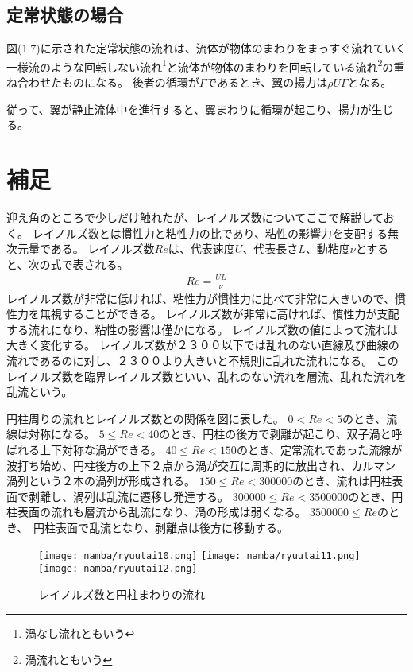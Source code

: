 \documentclass[10pt,b5paper,papersize,dvipdfmx]{jsbook}
\begin{document}
\subsection{定常状態の場合}
図(1.7)に示された定常状態の流れは、流体が物体のまわりをまっすぐ流れていく一様流のような回転しない流れ\footnote{渦なし流れともいう}と流体が物体のまわりを回転している流れ\footnote{渦流れともいう}の重ね合わせたものになる。
後者の循環が$\Gamma $であるとき、翼の揚力は$\rho U\Gamma$となる。
\par
\par
従って、翼が静止流体中を進行すると、翼まわりに循環が起こり、揚力が生じる。
\section{補足}
迎え角のところで少しだけ触れたが、レイノルズ数についてここで解説しておく。
レイノルズ数とは慣性力と粘性力の比であり、粘性の影響力を支配する無次元量である。
レイノルズ数$Re$は、代表速度$U$、代表長さ$L$、動粘度$\nu $とすると、次の式で表される。
\begin{align}
  Re = \frac{UL}{\nu }
\end{align}
レイノルズ数が非常に低ければ、粘性力が慣性力に比べて非常に大きいので、慣性力を無視することができる。
レイノルズ数が非常に高ければ、慣性力が支配する流れになり、粘性の影響は僅かになる。
レイノルズ数の値によって流れは大きく変化する。
レイノルズ数が２３００以下では乱れのない直線及び曲線の流れであるのに対し、２３００より大きいと不規則に乱れた流れになる。
このレイノルズ数を臨界レイノルズ数といい、乱れのない流れを層流、乱れた流れを乱流という。
\par
円柱周りの流れとレイノルズ数との関係を図に表した。
$0<Re<5$のとき、流線は対称になる。
$5\le Re<40$のとき、円柱の後方で剥離が起こり、双子渦と呼ばれる上下対称な渦ができる。
$40\le Re<150$のとき、定常流れであった流線が波打ち始め、円柱後方の上下２点から渦が交互に周期的に放出され、カルマン渦列という２本の渦列が形成される。
$150\le Re<300000$のとき、流れは円柱表面で剥離し、渦列は乱流に遷移し発達する。
$300000\le Re<3500000$のとき、円柱表面の流れも層流から乱流になり、渦の形成は弱くなる。
$3500000\le Re$のとき、　円柱表面で乱流となり、剥離点は後方に移動する。
\begin{figure}[ht]
  \centering
  \texttt{[image: namba/ryuutai10.png]}
  \centering
  \texttt{[image: namba/ryuutai11.png]}
  \centering
  \texttt{[image: namba/ryuutai12.png]}
  \caption{レイノルズ数と円柱まわりの流れ}
\end{figure}
\end{document}
